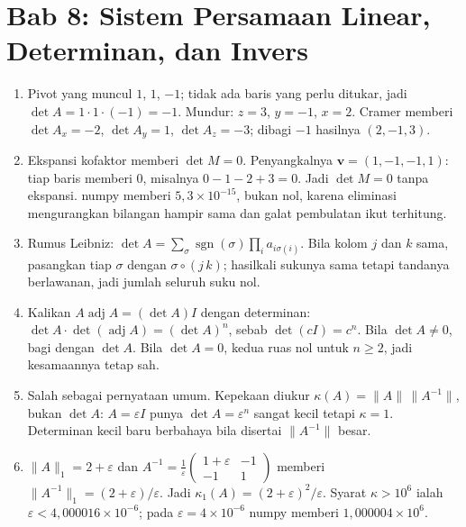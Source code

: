 \section*{Bab 8: Sistem Persamaan Linear, Determinan, dan Invers}
\begin{enumerate}[label=\textbf{8.\arabic*}]
  \item Pivot yang muncul $1$, $1$, $-1$; tidak ada baris yang perlu ditukar, jadi
        $\det A=1\cdot1\cdot(-1)=-1$. Mundur: $z=3$, $y=-1$, $x=2$. Cramer
        memberi $\det A_{x}=-2$, $\det A_{y}=1$, $\det A_{z}=-3$; dibagi $-1$
        hasilnya $(2,-1,3)$.

  \item Ekspansi kofaktor memberi $\det M=0$. Penyangkalnya
        $\mathbf{v}=(1,-1,-1,1)$: tiap baris memberi $0$, misalnya
        $0-1-2+3=0$. Jadi $\det M=0$ tanpa ekspansi. numpy memberi
        $5{,}3\times10^{-15}$, bukan nol, karena eliminasi mengurangkan bilangan
        hampir sama dan galat pembulatan ikut terhitung.

  \item Rumus Leibniz: $\det A=\sum_{\sigma}\operatorname{sgn}(\sigma)
        \prod_{i}a_{i\sigma(i)}$. Bila kolom $j$ dan $k$ sama, pasangkan tiap
        $\sigma$ dengan $\sigma\circ(j\,k)$; hasilkali sukunya sama tetapi
        tandanya berlawanan, jadi jumlah seluruh suku nol.

  \item Kalikan $A\operatorname{adj}A=(\det A)I$ dengan determinan:
        $\det A\cdot\det(\operatorname{adj}A)=(\det A)^{n}$, sebab
        $\det(cI)=c^{n}$. Bila $\det A\ne0$, bagi dengan $\det A$. Bila
        $\det A=0$, kedua ruas nol untuk $n\ge2$, jadi kesamaannya tetap sah.

  \item Salah sebagai pernyataan umum. Kepekaan diukur
        $\kappa(A)=\lVert A\rVert\,\lVert A^{-1}\rVert$, bukan $\det A$:
        $A=\varepsilon I$ punya $\det A=\varepsilon^{n}$ sangat kecil tetapi
        $\kappa=1$. Determinan kecil baru berbahaya bila disertai
        $\lVert A^{-1}\rVert$ besar.

  \item $\lVert A\rVert_{1}=2+\varepsilon$ dan
        $A^{-1}=\frac1\varepsilon\begin{pmatrix}1+\varepsilon&-1\\-1&1\end{pmatrix}$
        memberi $\lVert A^{-1}\rVert_{1}=(2+\varepsilon)/\varepsilon$. Jadi
        $\kappa_{1}(A)=(2+\varepsilon)^{2}/\varepsilon$. Syarat $\kappa>10^{6}$
        ialah $\varepsilon<4{,}000016\times10^{-6}$; pada
        $\varepsilon=4\times10^{-6}$ numpy memberi $1{,}000004\times10^{6}$.


\end{enumerate}
